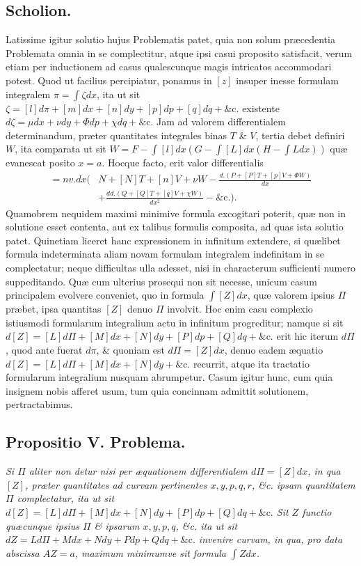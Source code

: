\subsection*{Scholion.}
 Latissime igitur solutio hujus Problematis patet, quia non solum præcedentia Problemata omnia in se complectitur, atque ipsi casui proposito satisfacit, verum etiam per inductionem ad casus qualescunque magis intricatos accommodari potest. Quod ut facilius percipiatur, ponamus in $[z]$ insuper inesse formulam integralem $\pi=\int\zeta dx$, ita ut sit $\zeta=[l]d\pi+[m]dx+[n]dy+[p]dp+[q]dq+\text{\&c.}$ existente $d\zeta=\mu dx+\nu dy+\Phi dp+\chi dq+\text{\&c.}$ Jam ad valorem differentialem determinandum, præter quantitates integrales binas $T$ \& $V$, tertia debet definiri $W$, ita comparata ut sit $W=F-\int[l]dx(G-\int[L]dx(H-\int Ldx))$ quæ evanescat posito $x=a$. Hocque facto, erit valor differentialis
\[
\begin{aligned}
=nv.dx\Biggl(&N+[N]T+[n]V+\nu W-\frac{d.(P+[P]T+[p]V+\Phi W)}{dx}\\
&+\frac{dd.(Q+[Q]T+[q]V+\chi W)}{dx^2}-\text{\&c.}\Biggr).
\end{aligned}
\]
Quamobrem nequidem maximi minimive formula excogitari poterit, quæ non in solutione esset contenta, aut ex talibus formulis composita, ad quas ista solutio patet. Quinetiam liceret hanc expressionem in infinitum extendere, si quælibet formula indeterminata aliam novam formulam integralem indefinitam in se complectatur; neque difficultas ulla adesset, nisi in characterum sufficienti numero suppeditando. Quæ cum ulterius prosequi non sit necesse, unicum casum principalem evolvere conveniet, quo
in formula $\int[Z]dx$, quæ valorem ipsius $\Pi$ præbet, ipsa quantitas $[Z]$ denuo $\Pi$ involvit. Hoc enim casu complexio istiusmodi formularum integralium actu in infinitum progreditur; namque si sit $d[Z]=[L]d\Pi+[M]dx+[N]dy+[P]dp+[Q]dq+\text{\&c.}$ erit hic iterum $d\Pi$, quod ante fuerat $d\pi$, \& quoniam est $d\Pi=[Z]dx$, denuo eadem æquatio $d[Z]=[L]d\Pi+[M]dx+[N]dy+\text{\&c.}$ recurrit, atque ita tractatio formularum integralium nusquam abrumpetur. Casum igitur hunc, cum quia insignem nobis afferet usum, tum quia concinnam admittit solutionem, pertractabimus.
\subsection*{Propositio V. Problema.}
 \textit{Si $\Pi$ aliter non detur nisi per æquationem differentialem $d\Pi=[Z]dx$, in qua $[Z]$, præter quantitates ad curvam pertinentes $x,y,p,q,r$, \&c. ipsam quantitatem $\Pi$ complectatur, ita ut sit $d[Z]=[L]d\Pi+[M]dx+[N]dy+[P]dp+[Q]dq+\text{\&c.}$ Sit $Z$ functio quæcunque ipsius $\Pi$ \& ipsarum $x,y,p,q$, \&c. ita ut sit $dZ=Ld\Pi+Mdx+Ndy+Pdp+Qdq+\text{\&c.}$ invenire curvam, in qua, pro data abscissa $AZ=a$, maximum minimumve sit formula $\int Zdx$.}
